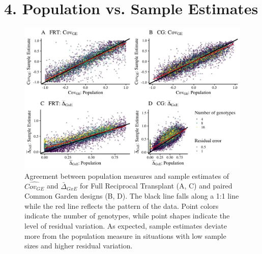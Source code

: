 \documentclass[11pt, oneside]{amsart}
\begin{document}
\clearpage
\newpage

\renewcommand{\figurename}{Supplementary Figure}
\section{4. Population vs. Sample Estimates}
\renewcommand\thefigure{S4}
\begin{figure}[h]
\begin{center}
\includegraphics[width=6in]{Figs/SampleVsPopulation.jpeg}
\end{center}
\label{Fig: Population vs. Sample Estimates}
\caption[Agreement between population measures and sample estimates of  $\hat{Cov_{GE}}$ and $\bar\Delta_{GxE}$ for Full Reciprocal Transplant (A, C) and paired Common Garden designs (B, D). ]{Agreement between population measures and sample estimates of  $\hat{Cov_{GE}}$ and $\bar\Delta_{GxE}$ for Full Reciprocal Transplant (A, C) and paired Common Garden designs (B, D). The black line falls along a 1:1 line while the red line reflects the pattern of the data. Point colors indicate the number of genotypes, while point shapes indicate the level of residual variation. As expected, sample estimates deviate more from the population measure in situations with low sample sizes and higher residual variation.}
\end{figure}


\clearpage
\newpage

\renewcommand{\figurename}{Supplementary Figure}
\end{document}
